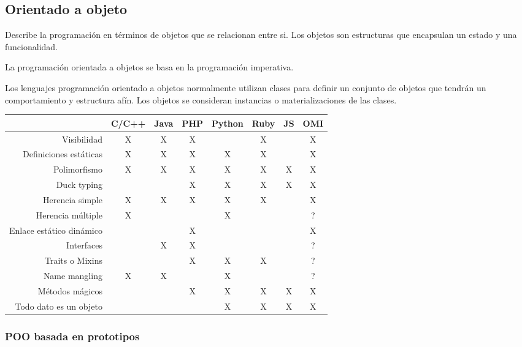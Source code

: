 \subsection{Orientado a objeto}
Describe la programación en términos de objetos que se relacionan entre si. Los objetos son 
estructuras que encapsulan un estado y una funcionalidad. 

La programación orientada a objetos se basa en la programación imperativa.

Los lenguajes programación orientado a objetos normalmente utilizan clases 
para definir un conjunto de objetos que tendrán un comportamiento y estructura afín. 
Los objetos se consideran instancias o materializaciones de las clases.


\FloatBarrier
\begin{table}[h]
\begin{center}
 
\begin{tabular}{|r|c|c|c|c|c|c|c|} \hline
 & C/C++ & Java & PHP  & Python & Ruby & JS & OMI\\ \hline
Visibilidad & X & X & X &  & X &  & X \\ \hline
Definiciones estáticas & X & X & X & X & X &  & X \\ \hline
Polimorfismo & X & X & X & X & X & X & X \\ \hline
Duck typing & & & X & X & X & X & X \\ \hline
Herencia simple  & X & X & X & X & X &  & X \\ \hline
Herencia múltiple  & X & &  & X &  &  & ? \\ \hline
Enlace estático dinámico & & & X &  &  &  &  X \\ \hline
Interfaces & & X & X &  &  &  &  ? \\ \hline
Traits o Mixins & & & X & X & X &  &  ? \\ \hline
Name mangling & X & X & & X & & & ? \\ \hline
Métodos mágicos & & & X & X & X & X & X \\ \hline 
Todo dato es un objeto & & &  & X & X & X & X \\ \hline 
\end{tabular}
\end{center}
\end{table}
\FloatBarrier

\subsubsection{POO basada en prototipos}

